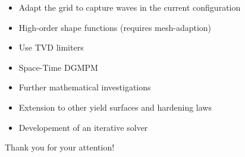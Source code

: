 \documentclass[11pt,aspectratio=169]{beamer}
\begin{document}
\begin{frame}[standout]{}
  \begin{footnotesize}
    \begin{block}{}
      \begin{itemize}
      \item[] Adapt the grid to capture waves in the current configuration
      \item[] High-order shape functions (requires mesh-adaption)
      \item[] Use TVD limiters
      \item[] Space-Time DGMPM
      \end{itemize}
    \end{block}

    
    \begin{block}{}
      \begin{itemize}
      \item[] Further mathematical investigations
      \item[] Extension to other yield surfaces and hardening laws
      \item[] Developement of an iterative solver
      \end{itemize}
    \end{block}
  \end{footnotesize}
\end{frame}

\begin{frame}[standout]{}
  Thank you for your attention!
\end{frame}

\appendix


\end{document}

